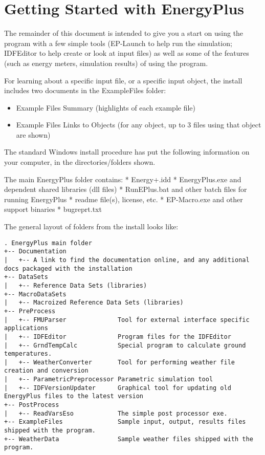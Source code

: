 \chapter{Getting Started with EnergyPlus}\label{getting-started-with-energyplus}

The remainder of this document is intended to give you a start on using the program with a few simple tools (EP-Launch to help run the simulation; IDFEditor to help create or look at input files) as well as some of the features (such as energy meters, simulation results) of using the program.

For learning about a specific input file, or a specific input object, the install includes two documents in the ExampleFiles folder:

\begin{itemize}
\item
  Example Files Summary (highlights of each example file)
\item
  Example Files Links to Objects (for any object, up to 3 files using that object are shown)
\end{itemize}

The standard Windows install procedure has put the following information on your computer, in the directories/folders shown.

The main EnergyPlus folder contains: * Energy+.idd * EnergyPlus.exe and dependent shared libraries (dll files) * RunEPlus.bat and other batch files for running EnergyPlus * readme file(s), license, etc. * EP-Macro.exe and other support binaries * bugreprt.txt~

The general layout of folders from the install looks like:

\begin{lstlisting}
. EnergyPlus main folder
+-- Documentation
|   +-- A link to find the documentation online, and any additional docs packaged with the installation
+-- DataSets
|   +-- Reference Data Sets (libraries)
+-- MacroDataSets
|   +-- Macroized Reference Data Sets (libraries)
+-- PreProcess
|   +-- FMUParser              Tool for external interface specific applications
|   +-- IDFEditor              Program files for the IDFEditor
|   +-- GrndTempCalc           Special program to calculate ground temperatures.
|   +-- WeatherConverter       Tool for performing weather file creation and conversion
|   +-- ParametricPreprocessor Parametric simulation tool
|   +-- IDFVersionUpdater      Graphical tool for updating old EnergyPlus files to the latest version
+-- PostProcess
|   +-- ReadVarsEso            The simple post processor exe.
+-- ExampleFiles               Sample input, output, results files shipped with the program.
+-- WeatherData                Sample weather files shipped with the program.
\end{lstlisting}

